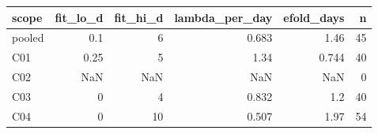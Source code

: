 \begin{tabular}{lrrrrr}
\toprule
scope & fit_lo_d & fit_hi_d & lambda_per_day & efold_days & n \\
\midrule
pooled & 0.1 & 6 & 0.683 & 1.46 & 45 \\
C01 & 0.25 & 5 & 1.34 & 0.744 & 40 \\
C02 & NaN & NaN & NaN & NaN & 0 \\
C03 & 0 & 4 & 0.832 & 1.2 & 40 \\
C04 & 0 & 10 & 0.507 & 1.97 & 54 \\
\bottomrule
\end{tabular}
